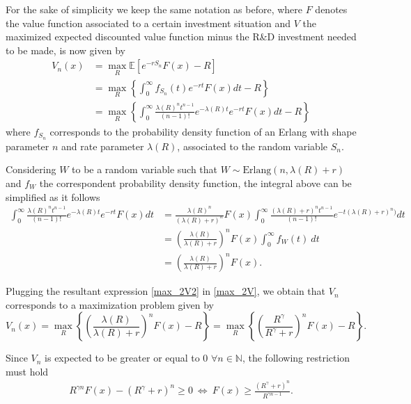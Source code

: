 For the sake of simplicity we keep the same notation as before, where $F$ denotes the value function associated to a certain investment situation and $V$ the maximized expected discounted value function minus the R\&D investment needed to be made, is now given by
\begin{align}
V_n(x)&=\max_R \mathds{E} [ e^{-rS_n}F(x)-R] \nonumber \\
&=\max_R  \left\{ \int_0 ^\infty f_{S_n}(t) e^{-rt} F(x) dt -R \right\} \nonumber \\
&=\max_R  \left\{ \int_0 ^\infty \frac{\lambda(R)^n t^{n-1}}{(n-1)!} e^{-\lambda(R)t} e^{-rt} F(x) dt -R \right\}
\label{max_2V}
\end{align}
where $f_{S_n}$ corresponds to the probability density function of an Erlang with shape parameter $n$ and rate parameter $\lambda(R)$, associated to the random variable $S_n$.

Considering $W$ to be a random variable such that $W \sim \text{Erlang}(n, \lambda(R)+r)$ and $f_W$ the correspondent probability density function, the integral above can be simplified as it follows
\begin{align}
\int_0 ^\infty \frac{\lambda(R)^n t^{n-1}}{(n-1)!} e^{-\lambda(R)t} e^{-rt} F(x) dt &=
\frac{\lambda(R)^n}{(\lambda(R)+r)^n} F(x) \int_0 ^\infty \frac{(\lambda(R)+r)^n t^{n-1}}{(n-1)!} e^{-t(\lambda(R)+r)^n)} dt \nonumber \\
&=\left( \frac{\lambda(R)}{\lambda(R)+r}\right)^n F(x)  \int_0 ^\infty f_W(t) \ dt \nonumber \\
&=\left( \frac{\lambda(R)}{\lambda(R)+r}\right)^n F(x). \label{max_2V2}
\end{align}

Plugging the resultant expression \eqref{max_2V2} in \eqref{max_2V}, we obtain that $V_n$ corresponds to a maximization problem given by
\begin{equation}
V_n(x)=\max_R \left\{ \left( \frac{\lambda(R)}{\lambda(R)+r}\right)^n F(x)-R \right\}=\max_R \left\{ \left( \frac{R^\gamma}{R^\gamma+r}\right)^n F(x)-R \right\}.
	\label{max_2V3}
\end{equation}

Since $V_n$ is expected to be greater or equal to 0 $\forall n \in \mathds{N}$, the following restriction must hold
\begin{align}
R^{\gamma n} F(x)-(R^\gamma + r)^n \geq 0 \  \Leftrightarrow \ F(x) \geq \frac{(R^\gamma+r)^n}{R^{\gamma n -1}}.
\label{max_2rest}
\end{align}


